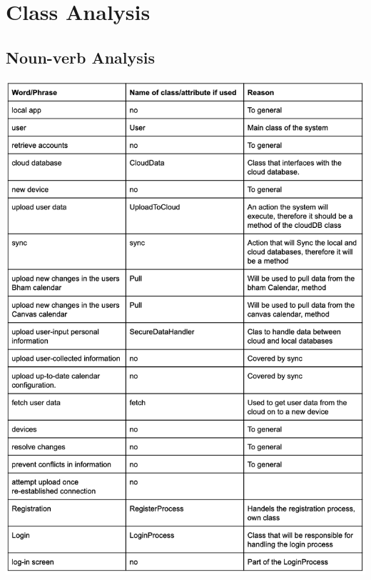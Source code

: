 \documentclass[a4paper,11pt]{article} %
\begin{document}
\section{Class Analysis}
\subsection{Noun-verb Analysis}
\begin{center}
    \includegraphics[scale=0.9]{img/noun-verb/table1.png}
    \newpage

\end{center}
\end{document}
